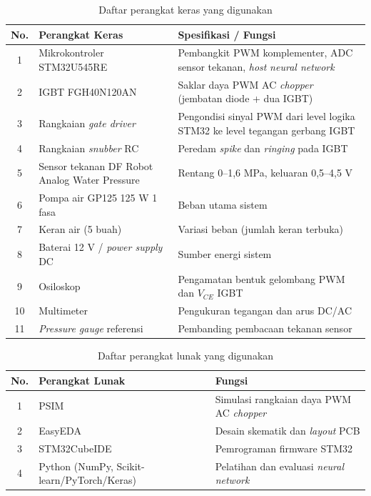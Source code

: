 \begin{table}[H]
  \centering
  \caption{Daftar perangkat keras yang digunakan}
  \label{tab:perangkat-keras}
  \begin{tabular}{|c|p{4.5cm}|p{5.5cm}|}
  \hline
  \textbf{No.} & \textbf{Perangkat Keras} & \textbf{Spesifikasi / Fungsi} \\
  \hline
  1 & Mikrokontroler STM32U545RE &
      Pembangkit PWM komplementer, ADC sensor tekanan,
      \emph{host} \emph{neural network} \\
  \hline
  2 & IGBT FGH40N120AN &
      Saklar daya PWM AC \emph{chopper} (jembatan diode + dua IGBT) \\
  \hline
  3 & Rangkaian \emph{gate driver} &
      Pengondisi sinyal PWM dari level logika STM32 ke
      level tegangan gerbang IGBT \\
  \hline
  4 & Rangkaian \emph{snubber} RC &
      Peredam \emph{spike} dan \emph{ringing} pada IGBT \\
  \hline
  5 & Sensor tekanan DF Robot Analog Water Pressure &
      Rentang 0--1{,}6 MPa, keluaran 0{,}5--4{,}5 V \\
  \hline
  6 & Pompa air GP125 125 W 1 fasa &
      Beban utama sistem \\
  \hline
  7 & Keran air (5 buah) &
      Variasi beban (jumlah keran terbuka) \\
  \hline
  8 & Baterai 12 V / \emph{power supply} DC &
      Sumber energi sistem \\
  \hline
  9 & Osiloskop &
      Pengamatan bentuk gelombang PWM dan $V_{CE}$ IGBT \\
  \hline
  10 & Multimeter &
      Pengukuran tegangan dan arus DC/AC \\
  \hline
  11 & \emph{Pressure gauge} referensi &
      Pembanding pembacaan tekanan sensor \\
  \hline
  \end{tabular}
\end{table}

\begin{table}[H]
  \centering
  \caption{Daftar perangkat lunak yang digunakan}
  \label{tab:perangkat-lunak}
  \begin{tabular}{|c|p{3.5cm}|p{6.5cm}|}
  \hline
  \textbf{No.} & \textbf{Perangkat Lunak} & \textbf{Fungsi} \\
  \hline
  1 & PSIM &
      Simulasi rangkaian daya PWM AC \emph{chopper} \\
  \hline
  2 & EasyEDA &
      Desain skematik dan \emph{layout} PCB \\
  \hline
  3 & STM32CubeIDE &
      Pemrograman firmware STM32 \\
  \hline
  4 & Python (NumPy, Scikit-learn/PyTorch/Keras) &
      Pelatihan dan evaluasi \emph{neural network} \\
  \hline
  \end{tabular}
\end{table}

